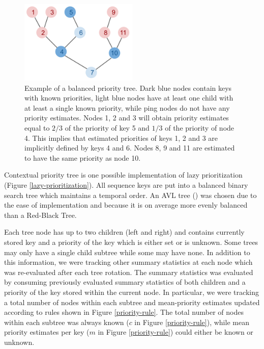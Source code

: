 \documentclass{article}
\begin{document}
\begin{figure}
\centering
\begin{minipage}{1.0\textwidth}  
  \centering
  \includegraphics[width=0.5\textwidth]{priority_tree}
  \caption{Example of a balanced priority tree. Dark blue nodes contain keys 
    with known priorities, light blue nodes have at least one child with at 
    least a single known priority, while ping nodes do not have any priority 
    estimates. Nodes 1, 2 and 3 will obtain priority estimates equal to $2/3$ 
    of the priority of key 5 and $1/3$ of the priority of node 4. This implies 
    that estimated priorities of keys 1, 2 and 3 are implicitly defined by keys 
    4 and 6. Nodes 8, 9 and 11 are estimated to have the same priority as node 
    10.}
  \label{priority-tree}
\end{minipage}%
\end{figure}

Contextual priority tree is one possible implementation of lazy 
prioritization (Figure \ref{lazy-prioritization}). All sequence 
keys are put into a balanced binary search tree which maintains a temporal 
order. An AVL tree (\cite{velskii1976avl}) was chosen due to the ease of 
implementation and because it is on average more evenly balanced than a 
Red-Black Tree.

Each tree node has up to two children (left and right) and contains currently 
stored key 
and a priority of the key which is either set or is unknown. Some trees may 
only 
have a single child subtree while some may have none. In addition to this 
information, we were tracking other summary statistics at each node which was 
re-evaluated after each tree rotation. The summary statistics was evaluated by 
consuming previously evaluated summary statistics of both children and a 
priority of the key stored within the current node. In particular, we were 
tracking a total number of nodes within each subtree and mean-priority 
estimates 
updated according to rules shown in Figure \ref{priority-rule}. The total 
number of 
nodes within each subtree was always known ($c$ in Figure \ref{priority-rule}), 
while mean priority estimates per key ($m$ in Figure \ref{priority-rule}) could 
either be known or unknown. 
\end{document}
